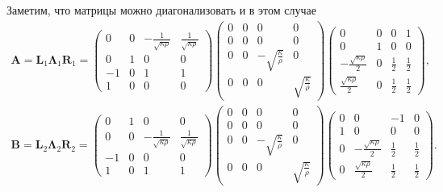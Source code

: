 \noindent Заметим, что матрицы можно диагонализовать и в этом случае
\begin{gather*}
	\pmb{A} = \pmb{L}_1 \pmb{\Lambda}_1 \pmb{R}_1 = 
	\begin{pmatrix}
    	0 & 0 & -\frac{1}{\sqrt{\kappa\rho}} & \frac{1}{\sqrt{\kappa\rho}} \\
    	0 & 1 & 0 & 0 \\
        -1 & 0 & 1 & 1 \\
    	1 & 0 & 0 & 0
	\end{pmatrix} 
	\begin{pmatrix}
    	0 & 0 & 0 & 0 \\
    	0 & 0 & 0 & 0 \\
        0 & 0 & -\sqrt{\frac{\kappa}{\rho}} & 0 \\
    	0 & 0 & 0 & \sqrt{\frac{\kappa}{\rho}}
	\end{pmatrix} 
	\begin{pmatrix}
    	0 & 0 & 0 & 1 \\
    	0 & 1 & 0 & 0 \\
        -\frac{\sqrt{\kappa\rho}}{2} & 0 & \frac{1}{2} & \frac{1}{2} \\
        \frac{\sqrt{\kappa\rho}}{2} & 0 & \frac{1}{2} & \frac{1}{2}
	\end{pmatrix} , \\
	\pmb{B} = \pmb{L}_2 \pmb{\Lambda}_2 \pmb{R}_2 = 
	\begin{pmatrix}
    	0 & 1 & 0 & 0 \\
    	0 & 0 & -\frac{1}{\sqrt{\kappa\rho}} & \frac{1}{\sqrt{\kappa\rho}} \\
    	-1 & 0 & 0 & 0 \\
        1 & 0 & 1 & 1 
	\end{pmatrix} 
	\begin{pmatrix}
    	0 & 0 & 0 & 0 \\
    	0 & 0 & 0 & 0 \\
        0 & 0 & -\sqrt{\frac{\kappa}{\rho}} & 0 \\
    	0 & 0 & 0 & \sqrt{\frac{\kappa}{\rho}}
	\end{pmatrix} 
	\begin{pmatrix}
    	0 & 0 & -1 & 0 \\
    	1 & 0 & 0 & 0 \\
        0 & -\frac{\sqrt{\kappa\rho}}{2} & \frac{1}{2} & \frac{1}{2} \\
        0 & \frac{\sqrt{\kappa\rho}}{2}  & \frac{1}{2} & \frac{1}{2}
	\end{pmatrix} .
\end{gather*}

